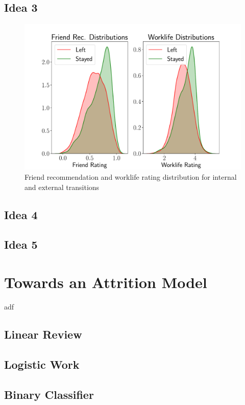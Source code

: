 \documentclass[10pt]{article}
\begin{document}
\subsection{Idea 3}


\begin{figure}[thb]
    \centering
	\includegraphics[width=1.0\linewidth]{discdist.pdf}
	\caption{Friend recommendation and worklife rating distribution for internal 
    and external transitions}
	\label{fig:transmat}
\end{figure}

\subsection{Idea 4}
\subsection{Idea 5}

\section{Towards an Attrition Model}

adf

\subsection{Linear Review}


\subsection{Logistic Work}


\subsection{Binary Classifier}
\end{document}
